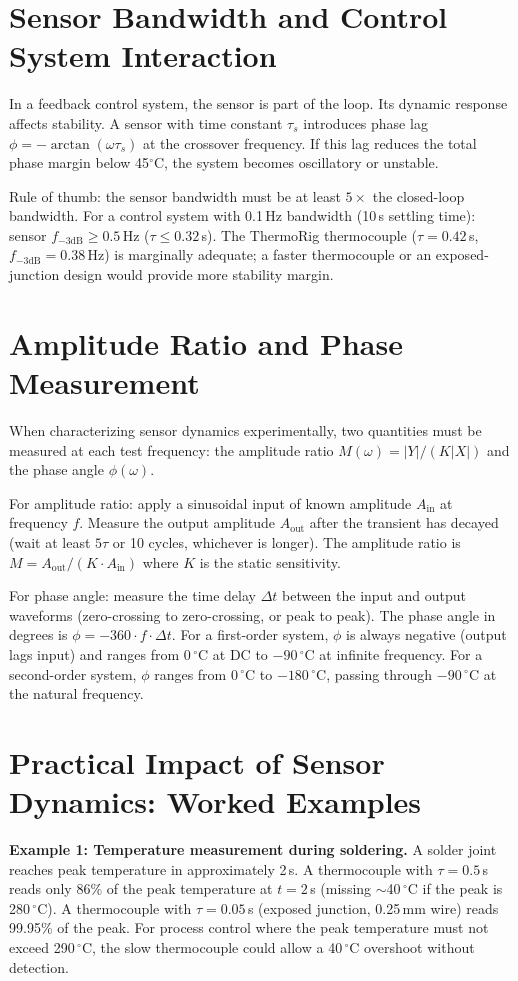 \documentclass[11pt,letterpaper,twoside,openany]{book}
\newcommand{\degC}{\ensuremath{{}^{\circ}\text{C}}}
\begin{document}
\section{Sensor Bandwidth and Control System Interaction}
In a feedback control system, the sensor is part of the loop. Its dynamic response affects stability. A sensor with time constant $\tau_s$ introduces phase lag $\phi = -\arctan(\omega \tau_s)$ at the crossover frequency. If this lag reduces the total phase margin below 45\degC{}, the system becomes oscillatory or unstable.

Rule of thumb: the sensor bandwidth must be at least $5\times$ the closed-loop bandwidth. For a control system with 0.1\,Hz bandwidth (10\,s settling time): sensor $f_{-3\text{dB}} \geq 0.5$\,Hz ($\tau \leq 0.32$\,s). The ThermoRig thermocouple ($\tau = 0.42$\,s, $f_{-3\text{dB}} = 0.38$\,Hz) is marginally adequate; a faster thermocouple or an exposed-junction design would provide more stability margin.
\section{Amplitude Ratio and Phase Measurement}
When characterizing sensor dynamics experimentally, two quantities must be measured at each test frequency: the amplitude ratio $M(\omega) = |Y|/(K|X|)$ and the phase angle $\phi(\omega)$.

For amplitude ratio: apply a sinusoidal input of known amplitude $A_{\text{in}}$ at frequency $f$. Measure the output amplitude $A_{\text{out}}$ after the transient has decayed (wait at least $5\tau$ or 10 cycles, whichever is longer). The amplitude ratio is $M = A_{\text{out}}/(K \cdot A_{\text{in}})$ where $K$ is the static sensitivity.

For phase angle: measure the time delay $\Delta t$ between the input and output waveforms (zero-crossing to zero-crossing, or peak to peak). The phase angle in degrees is $\phi = -360 \cdot f \cdot \Delta t$. For a first-order system, $\phi$ is always negative (output lags input) and ranges from 0\,\degC{} at DC to $-90$\,\degC{} at infinite frequency. For a second-order system, $\phi$ ranges from 0\,\degC{} to $-180$\,\degC{}, passing through $-90$\,\degC{} at the natural frequency.

\section{Practical Impact of Sensor Dynamics: Worked Examples}
\textbf{Example 1: Temperature measurement during soldering.} A solder joint reaches peak temperature in approximately 2\,s. A thermocouple with $\tau = 0.5$\,s reads only 86\% of the peak temperature at $t = 2$\,s (missing $\sim$40\,\degC{} if the peak is 280\,\degC{}). A thermocouple with $\tau = 0.05$\,s (exposed junction, 0.25\,mm wire) reads 99.95\% of the peak. For process control where the peak temperature must not exceed 290\,\degC{}, the slow thermocouple could allow a 40\,\degC{} overshoot without detection.
\end{document}
